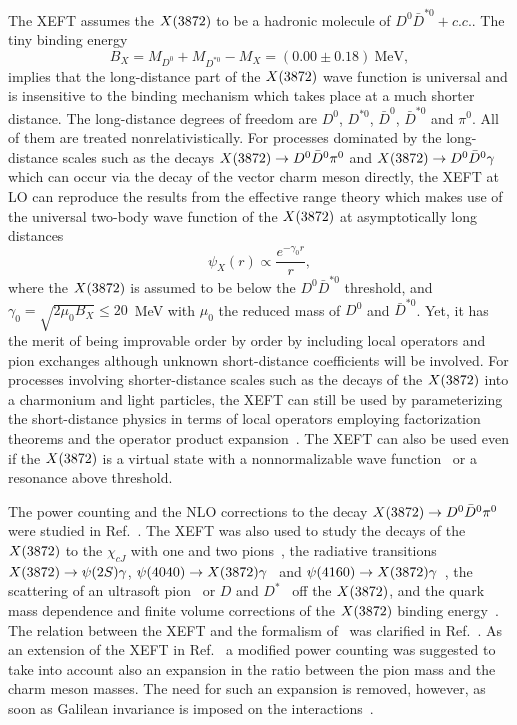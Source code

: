 The XEFT assumes the $X(3872)$ to be a hadronic molecule of $D^0\bar D^{*0}+c.c.$.
The tiny binding energy~\cite{Olive:2016xmw}
\begin{equation}
  B_{X}=M_{D^0} +M_{D^{*0}}-M_X=(0.00\pm0.18)~\text{MeV},
  \label{eq:Xbe}
\end{equation}  
implies that the long-distance part of the $X(3872)$ wave function is universal
and is insensitive to the binding mechanism which takes place at a much shorter
distance.
%
The long-distance degrees of freedom are $D^0$, $D^{*0}$, $\bar
D^0$, $\bar D^{*0}$ and $\pi^0$. All of them are treated nonrelativistically.
%
For processes dominated by the long-distance scales such as the decays $X(3872)\to
D^0\bar D^0\pi^0$ and $X(3872)\to D^0\bar D^0\gamma$ which can occur via the decay of
the vector charm meson directly, the XEFT at LO can reproduce the results
from the effective range theory which makes use of the universal two-body wave
function of the $X(3872)$ at asymptotically long 
distances~\cite{Voloshin:2003nt,Voloshin:2005rt}
\begin{equation}
  \psi_X(r) \propto \frac{e^{-\gamma_0 r}}{r},
\end{equation}
where the $X(3872)$ is assumed to be below the $D^0\bar D^{*0}$ threshold, and
$\gamma_0=\sqrt{2\mu_0 B_{X}}\leq20$~MeV with $\mu_0$ the reduced mass of 
$D^0$
and $\bar D^{*0}$.
Yet, it has the merit of being improvable order by order by including local
operators and pion exchanges although unknown short-distance coefficients will 
be involved. For processes involving shorter-distance scales such as the decays 
of the $X(3872)$ into a charmonium and light particles, the XEFT can still be used by
parameterizing the short-distance physics in terms of local operators employing
factorization theorems and the operator product 
expansion~\cite{Braaten:2005jj,Braaten:2006sy}. The XEFT can also be used even
if the $X(3872)$ is a virtual state with a nonnormalizable wave
function~\cite{Hanhart:2007yq} or a resonance above threshold.

The power counting and the NLO corrections to the decay $X(3872)\to D^0\bar D^{0}
\pi^0$ were studied in Ref.~\cite{Fleming:2007rp}. The XEFT was also used to
study the decays of the $X(3872)$ to the $\chi_{cJ}$ with one and two
pions~\cite{Fleming:2008yn,Fleming:2011xa}, the radiative transitions
$X(3872)\to\psi(2S)\gamma$, $\psi(4040)\to X(3872)\gamma$~\cite{Mehen:2011ds} and
$\psi(4160)\to X(3872)\gamma$~\cite{Margaryan:2013tta}, the scattering of an
ultrasoft pion~\cite{Braaten:2010mg} or $D$ and $D^*$~\cite{Canham:2009zq} off
the $X(3872)$, and the quark mass dependence and finite volume corrections of the
$X(3872)$ binding energy~\cite{Jansen:2013cba,Jansen:2015lha}.
The relation between the XEFT and the formalism of \nreft~was clarified in
Ref.~\cite{Mehen:2015efa}.
As an extension of the XEFT in Ref.~\cite{Alhakami:2015uea} a modified power
counting was suggested to take into account also an expansion in the ratio
between the pion mass and the charm meson masses. The need for such an
expansion is removed, however, as soon as Galilean invariance is imposed on the
interactions~\cite{Braaten:2015tga}.


